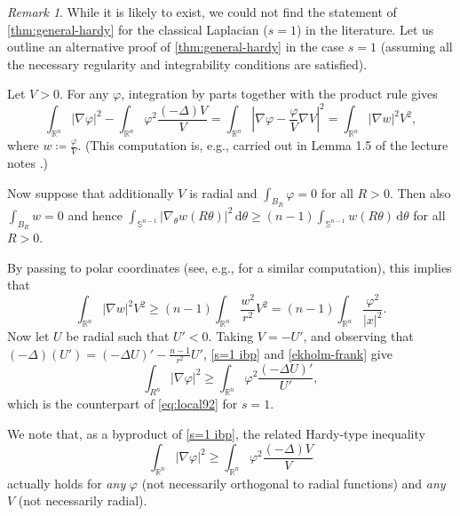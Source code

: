 \documentclass[10pt, reqno]{amsart}
\newcounter{results}[section] %
\theoremstyle{plain}
\theoremstyle{remark}
\newtheorem{remark}[results]{Remark}
\theoremstyle{definition}
\numberwithin{equation}{section}
\theoremstyle{plain}
\newcommand{\R}{\ensuremath{\mathbb R}} %
\newcommand{\defeq}{\ensuremath{\coloneqq}}%
\begin{document}
\begin{remark}
\label{remark s=1}
While it is likely to exist, we could not find the statement of \cref{thm:general-hardy} for the classical Laplacian ($s=1$) in the literature.
Let us outline an alternative proof of \cref{thm:general-hardy} in the case $s=1$ (assuming all the necessary regularity and integrability conditions are satisfied).

Let $V>0$. For any $\varphi$,  integration by parts together with the product rule gives 
    \begin{equation}
        \label{s=1 ibp}
        \int_{\R^n} |\nabla \varphi|^2 - \int_{\R^n} \varphi^2 \frac{(-\Delta)V}{V} = \int_{\R^n} \left|\nabla \varphi - \frac{\varphi}{V} \nabla V\right|^2 = \int_{\R^n} |\nabla w|^2 V^2 ,
    \end{equation}
    where $w \defeq \frac{\varphi}{V}$. (This computation is, e.g., carried out in Lemma 1.5 of the lecture notes \cite{Frank2011}.)

Now suppose that additionally $V$ is radial and $\int_{B_R} \varphi = 0$ for all $R >0$. Then also $\int_{B_R} w = 0$ and hence $\int_{\mathbb S^{n-1}} |\nabla_\theta w(R \theta)|^2 \, \mathrm d \theta \geq (n-1)  \int_{\mathbb S^{n-1}} w(R \theta) \, \mathrm d \theta$ for all $R > 0$. 

By passing to polar coordinates (see, e.g., \cite[Lemma 2.4]{Ekholm2006} for a similar computation), this implies that 
\begin{equation}
    \label{ekholm-frank}
    \int_{\R^n} |\nabla w|^2 V^2 \geq (n-1) \int_{\R^n} \frac{w^2}{r^2}V^2 = (n-1) \int_{\R^n} \frac{\varphi^2}{|x|^2}. 
\end{equation}
Now let $U$ be radial such that $U' < 0$. Taking $V = -U'$, and observing that $(-\Delta)(U') = (-\Delta U)' - \frac{n-1}{r^2} U'$,  \eqref{s=1 ibp} and \eqref{ekholm-frank} give
\begin{equation}
    \label{s=1 hardy}
    \int_{R^n} |\nabla \varphi|^2 \geq \int_{\R^n} \varphi^2 \frac{(-\Delta U)'}{U'}, 
\end{equation} 
which is the counterpart of \cref{eq:local92} for $s = 1$. 

We note that, as a byproduct of \cref{s=1 ibp}, the related Hardy-type inequality 
\[ \int_{\R^n} |\nabla \varphi|^2 \geq \int_{\R^n} \varphi^2 \frac{(-\Delta)V}{V} \]
 actually holds for \emph{any} $\varphi$ (not necessarily orthogonal to radial functions) and \emph{any} $V$ (not necessarily radial). 
\end{remark} 
\end{document}
